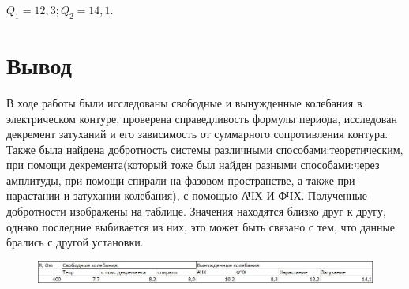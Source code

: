 \documentclass[a4paper,12pt]{article}
\begin{document}
$Q_1 = 12,3; Q_2 = 14,1$.

\section*{Вывод}
В ходе работы были исследованы свободные и вынужденные колебания в электрическом контуре, проверена справедливость формулы периода, исследован декремент затуханий и его зависимость от суммарного сопротивления контура. Также была найдена добротность системы различными способами:теоретическим, при помощи декремента(который тоже был найден разными способами:через амплитуды, при помощи спирали на фазовом пространстве, а также при нарастании и затухании колебания), с помощью АЧХ И ФЧХ. Полученные добротности изображены на таблице. Значения находятся близко друг к другу, однако последние выбивается из них, это может быть связано с тем, что данные брались с другой установки.

\begin{figure}[H]
    		\includegraphics[width=1.05\textwidth]{tablizavivod.jpg}
\end{figure}
\end{document}
